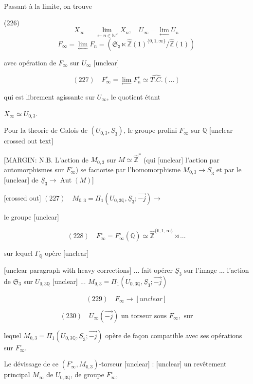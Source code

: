 Passant à la limite, on trouve

(226)
$$ X_\infty = \lim_{\longleftarrow n \in \mathbb{N}^\times} X_n , \quad U_\infty = \lim_{\longleftarrow} U_n $$
$$ F_\infty = \lim_{\longleftarrow} F_n = \left( \mathfrak{S}_3 \ltimes \hat{\mathbb{Z}}(1)^{\{0,1,\infty\}} / \hat{\mathbb{Z}}(1) \right) $$

\newpage


avec opération de $F_\infty$ sur $U_\infty$ [unclear]

$$(227) \quad F_\infty^\circ = \lim_{\longleftarrow} F_n^\circ \simeq \widehat{T.C.}( \dots )$$

qui est librement agissante sur $U_\infty$, le quotient étant

$X_\infty \simeq U_{0,3}$.

Pour la theorie de Galois de $(U_{0,3}, \underline{S}_3)$,
le groupe profini $F_\infty$ sur $\mathbb{Q}$ [unclear crossed out text]

[MARGIN: N.B. L'action de $M_{0,3}$ sur $M \simeq \hat{\mathbb{Z}}^*$ (qui [unclear] l'action par automorphismes sur $F_\infty^\circ$) se factorise par l'homomorphisme $M_{0,3} \to \underline{S}_3$ et par le [unclear] de $\underline{S}_3 \to \operatorname{Aut}(M)$]

[crossed out] $(227) \quad M_{0,3} = \Pi_1(U_{0,3 \mathbb{Q}}, \underline{S}_3 ; \vec{-j}) \to$

le groupe [unclear]

$$(228) \quad F_\infty^\circ = F_\infty^\circ(\bar{\mathbb{Q}}) \simeq \hat{\mathbb{Z}}^{\{0,1,\infty\}} \rtimes \dots$$

sur lequel $\Gamma_\mathbb{Q}$ opère [unclear]

[unclear paragraph with heavy corrections] ... fait opérer $\underline{S}_3$ sur l'image ... l'action de $\mathfrak{S}_3$ sur $U_{0,3 \mathbb{Q}}$ [unclear] ... $M_{0,3} = \Pi_1(U_{0,3 \mathbb{Q}}, \underline{S}_3 ; \vec{-j})$

$$(229) \quad F_\infty \to [unclear]$$

$$(230) \quad U_\infty(\vec{-j}) \text{ un torseur sous } F_\infty^\circ, \text{ sur}$$

lequel $M_{0,3} = \Pi_1(U_{0,3 \mathbb{Q}}, \underline{S}_3 ; \vec{-j})$ opère
de façon compatible avec ses opérations
sur $F_\infty^\circ$.

Le dévissage de ce $(F_\infty^\circ, M_{0,3})$-torseur
[unclear] : [unclear] un revêtement
principal $M_\infty$ de $U_{0,3 \mathbb{Q}}$, de groupe $F_\infty^\circ$,

